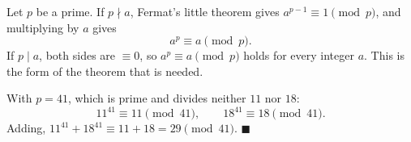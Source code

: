 Let $p$ be a prime. If $p\nmid a$, Fermat's little theorem gives $a^{p-1}\equiv1\pmod p$, and multiplying by $a$ gives
\[a^p\equiv a\pmod p .\]
If $p\mid a$, both sides are $\equiv0$, so $a^p\equiv a\pmod p$ holds for every integer $a$. This is the form of the theorem that is needed.

With $p=41$, which is prime and divides neither $11$ nor $18$:
\[11^{41}\equiv11\pmod{41},\qquad18^{41}\equiv18\pmod{41}.\]
Adding, $11^{41}+18^{41}\equiv11+18=\boxed{29}\pmod{41}$. $\blacksquare$
